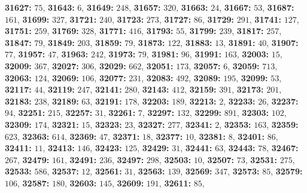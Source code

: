 \textsf{\bfseries 31627:} $75$, \textsf{\bfseries 31643:} $6$, \textsf{\bfseries 31649:} $248$, \textsf{\bfseries 31657:} $320$, \textsf{\bfseries 31663:} $24$, \textsf{\bfseries 31667:} $53$, \textsf{\bfseries 31687:} $161$, \textsf{\bfseries 31699:} $327$, \textsf{\bfseries 31721:} $240$, \textsf{\bfseries 31723:} $273$, \textsf{\bfseries 31727:} $86$, \textsf{\bfseries 31729:} $291$, \textsf{\bfseries 31741:} $127$, \textsf{\bfseries 31751:} $259$, \textsf{\bfseries 31769:} $328$, \textsf{\bfseries 31771:} $416$, \textsf{\bfseries 31793:} $55$, \textsf{\bfseries 31799:} $239$, \textsf{\bfseries 31817:} $257$, \textsf{\bfseries 31847:} $79$, \textsf{\bfseries 31849:} $203$, \textsf{\bfseries 31859:} $79$, \textsf{\bfseries 31873:} $122$, \textsf{\bfseries 31883:} $13$, \textsf{\bfseries 31891:} $40$, \textsf{\bfseries 31907:} $77$, \textsf{\bfseries 31957:} $47$, \textsf{\bfseries 31963:} $242$, \textsf{\bfseries 31973:} $79$, \textsf{\bfseries 31981:} $96$, \textsf{\bfseries 31991:} $163$, \textsf{\bfseries 32003:} $15$, \textsf{\bfseries 32009:} $367$, \textsf{\bfseries 32027:} $306$, \textsf{\bfseries 32029:} $662$, \textsf{\bfseries 32051:} $173$, \textsf{\bfseries 32057:} $6$, \textsf{\bfseries 32059:} $713$, \textsf{\bfseries 32063:} $124$, \textsf{\bfseries 32069:} $106$, \textsf{\bfseries 32077:} $231$, \textsf{\bfseries 32083:} $492$, \textsf{\bfseries 32089:} $195$, \textsf{\bfseries 32099:} $53$, \textsf{\bfseries 32117:} $44$, \textsf{\bfseries 32119:} $247$, \textsf{\bfseries 32141:} $280$, \textsf{\bfseries 32143:} $412$, \textsf{\bfseries 32159:} $391$, \textsf{\bfseries 32173:} $201$, \textsf{\bfseries 32183:} $238$, \textsf{\bfseries 32189:} $63$, \textsf{\bfseries 32191:} $178$, \textsf{\bfseries 32203:} $189$, \textsf{\bfseries 32213:} $2$, \textsf{\bfseries 32233:} $26$, \textsf{\bfseries 32237:} $94$, \textsf{\bfseries 32251:} $215$, \textsf{\bfseries 32257:} $31$, \textsf{\bfseries 32261:} $7$, \textsf{\bfseries 32297:} $132$, \textsf{\bfseries 32299:} $891$, \textsf{\bfseries 32303:} $102$, \textsf{\bfseries 32309:} $174$, \textsf{\bfseries 32321:} $15$, \textsf{\bfseries 32323:} $23$, \textsf{\bfseries 32327:} $277$, \textsf{\bfseries 32341:} $2$, \textsf{\bfseries 32353:} $163$, \textsf{\bfseries 32359:} $623$, \textsf{\bfseries 32363:} $614$, \textsf{\bfseries 32369:} $47$, \textsf{\bfseries 32371:} $18$, \textsf{\bfseries 32377:} $10$, \textsf{\bfseries 32381:} $8$, \textsf{\bfseries 32401:} $86$, \textsf{\bfseries 32411:} $11$, \textsf{\bfseries 32413:} $146$, \textsf{\bfseries 32423:} $125$, \textsf{\bfseries 32429:} $31$, \textsf{\bfseries 32441:} $63$, \textsf{\bfseries 32443:} $78$, \textsf{\bfseries 32467:} $267$, \textsf{\bfseries 32479:} $161$, \textsf{\bfseries 32491:} $236$, \textsf{\bfseries 32497:} $298$, \textsf{\bfseries 32503:} $10$, \textsf{\bfseries 32507:} $73$, \textsf{\bfseries 32531:} $275$, \textsf{\bfseries 32533:} $586$, \textsf{\bfseries 32537:} $12$, \textsf{\bfseries 32561:} $31$, \textsf{\bfseries 32563:} $139$, \textsf{\bfseries 32569:} $347$, \textsf{\bfseries 32573:} $85$, \textsf{\bfseries 32579:} $106$, \textsf{\bfseries 32587:} $180$, \textsf{\bfseries 32603:} $145$, \textsf{\bfseries 32609:} $191$, \textsf{\bfseries 32611:} $85$, 
